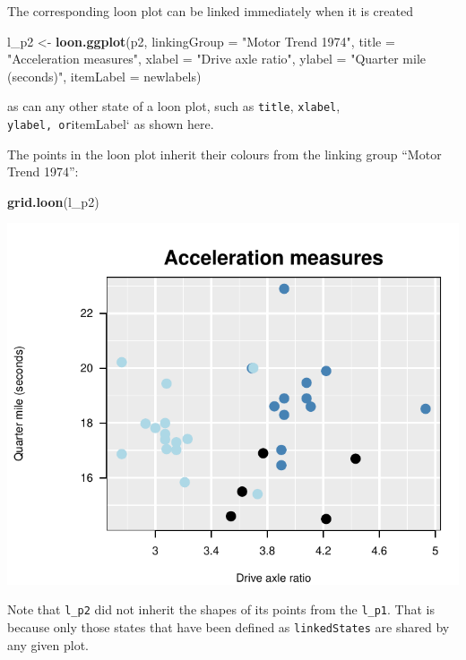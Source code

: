 \documentclass[]{article}
\newenvironment{Shaded}{\begin{snugshade}}{\end{snugshade}}
\newcommand{\KeywordTok}[1]{\textcolor[rgb]{0.13,0.29,0.53}{\textbf{#1}}}
\newcommand{\DataTypeTok}[1]{\textcolor[rgb]{0.13,0.29,0.53}{#1}}
\newcommand{\StringTok}[1]{\textcolor[rgb]{0.31,0.60,0.02}{#1}}
\newcommand{\NormalTok}[1]{#1}
\begin{document}
The corresponding loon plot can be linked immediately when it is created

\begin{Shaded}
\begin{Highlighting}[]
\NormalTok{l_p2 <-}\StringTok{ }\KeywordTok{loon.ggplot}\NormalTok{(p2, }
                    \DataTypeTok{linkingGroup =} \StringTok{"Motor Trend 1974"}\NormalTok{,}
                    \DataTypeTok{title =} \StringTok{"Acceleration measures"}\NormalTok{, }
                    \DataTypeTok{xlabel =} \StringTok{"Drive axle ratio"}\NormalTok{,}
                    \DataTypeTok{ylabel =} \StringTok{"Quarter mile (seconds)"}\NormalTok{,}
                    \DataTypeTok{itemLabel =}\NormalTok{ newlabels)}
\end{Highlighting}
\end{Shaded}

as can any other state of a loon plot, such as \texttt{title},
\texttt{xlabel}, \texttt{ylabel,\ or}itemLabel` as shown here.

The points in the loon plot inherit their colours from the linking group
``Motor Trend 1974'':

\begin{Shaded}
\begin{Highlighting}[]
\KeywordTok{grid.loon}\NormalTok{(l_p2)}
\end{Highlighting}
\end{Shaded}

\begin{center}\includegraphics[width=0.7\linewidth]{ggplots2loon_files/figure-latex/loon plot l_p2-1} \end{center}

Note that \texttt{l\_p2} did not inherit the shapes of its points from
the \texttt{l\_p1}. That is because only those states that have been
defined as \texttt{linkedStates} are shared by any given plot.
\end{document}
